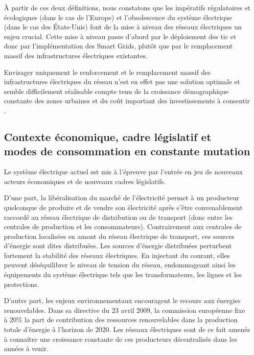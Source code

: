 À partir de ces deux définitions, nous constatons que les impératifs régulatoires et 
écologiques (dans le cas de l'Europe) et l'obsolescence du système 
électrique (dans le cas des États-Unis) font de la mise à niveau des réseaux 
électriques un enjeu crucial. Cette mise à niveau passe d'abord par le 
déploiement des \gls{tic} et donc par l'implémentation des Smart Grids, plutôt 
que par le remplacement massif des infrastructures électriques existantes. 

Envisager uniquement le renforcement et le remplacement massif des 
infrastructures électriques du  réseau 
n'est en effet pas une solution optimale et semble difficilement réalisable 
compte tenu de la croissance démographique constante des zones urbaines et du 
coût important des investissements à consentir \cite{cre}.

\subsection{Contexte économique, cadre législatif et\\
modes de consommation en constante mutation}

Le système électrique actuel est mis à l'épreuve par l'entrée en jeu de nouveaux 
acteurs économiques et de nouveaux cadres législatifs. 

D'une part, la libéralisation du marché de l'électricité permet à un producteur 
quelconque de produire et de vendre son électricité après s'être convenablement 
raccordé au réseau électrique de distribution ou de transport (donc entre les 
centrales de production et les consommateurs). Contrairement aux centrales de 
production localisées en amont du réseau électrique de transport, ces sources 
d'énergie sont dites distribuées. Les sources d'énergie distribuées perturbent 
fortement la stabilité des réseaux électriques. En injectant du courant, elles 
peuvent déséquilibrer le niveau de tension du réseau, endommageant ainsi les 
équipements du système électrique tels que les transformateurs, les lignes et 
les protections. 

D'autre part, les enjeux environnementaux encouragent le recours aux énergies 
renouvelables. Dans sa directive du 23 avril 2009, la commission européenne fixe 
à 20\% la part de contribution des ressources renouvelables dans la production 
totale d'énergie à l'horizon de 2020. Les réseaux électriques sont de ce fait 
amenés à connaître une croissance constante de ces producteurs décentralisés 
dans les années à venir.


